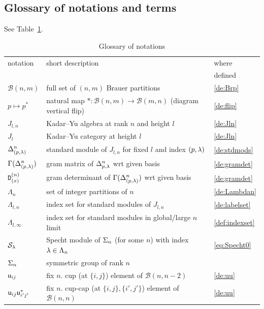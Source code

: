 \medskip 


\subsection{Glossary of notations and terms}

See Table~\ref{tab:glossary}. 

\newcommand{\Brp}{{\mathcal B}}   %

\begin{table}[]
    \centering
    \begin{tabular}{l|l|l}
    notation & short description & where  \\  
     & & defined \\ \hline
    $\Brp(n,m) $ & full set of $(n,m)$ Brauer partitions  &  \ref{de:Brp} \\ 
    $p \mapsto p^*$ & natural map $*:\Brp(n,m) \rightarrow \Brp(m,n)$ (diagram vertical flip) & \ref{de:flip} \\ 
    $J_{l,n}$   &  Kadar--Yu algebra at rank $n$ and height $l$ & \ref{de:Jln} \\  
    $J_l$     &  Kadar--Yu category at height $l$  &   \ref{de:Jln} \\ 
     $\Delta^{n}_{(p,\lambda)} $   &  standard module of $J_{l,n}$ for fixed $l$ and index $(p,\lambda)$ & \ref{de:stdmods} \\
     $ \Gamma(\Delta^{n}_{(p,\lambda)})  $ &  gram matrix of $\Delta^{n}_{p,\lambda}$ wrt given basis & \ref{de:gramdet} \\ 
     ${\mathtt D}^{(n)}_{(x)}$  & gram determinant of $ \Gamma(\Delta^{n}_{(p,\lambda)})  $ wrt given basis &\ref{de:gramdet} \\ 
     $\Lambda_n$ & set of integer partitions of $n$ &  \ref{de:Lambdan}  \\ 
     $\Lambda_{l,n}$ & index set for standard modules of $J_{l,n}$  & \ref{de:labelset}  \\ 
     $\Lambda_{l,\infty}$ & index set for standard modules in global/large $n$ limit  & \ref{def:indexset}  \\ 
     $\mathcal{S}_\lambda$ & Specht module of $\Sigma_n$ (for some $n$) with index $\lambda \in \Lambda_n$  &  \ref{eq:Specht0} \\ 
     $\Sigma_n$ & symmetric group of rank $n$\\
     ${\mathsf u}_{ij}$ & fix $n$. cup (at $\{i,j\}$) element of $\Brp(n,n-2)$  & \ref{de:uu} \\ 
     ${\mathsf u}_{ij} {\mathsf u}_{i'j'}^*$ & fix $n$. cup-cap (at $\{i,j\},\{ i',j' \}$) element of $\Brp(n,n)$  & \ref{de:uu} \\ 
    \end{tabular}
    \caption{Glossary of notations %
    } %
    \label{tab:glossary}
\end{table}


\newpage 

